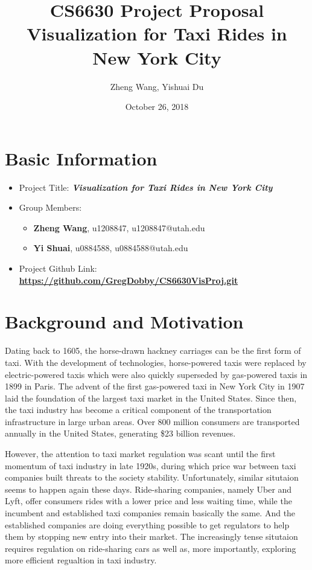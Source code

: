 \documentclass{article}
\title{CS6630 Project Proposal \protect\\ Visualization for Taxi Rides in New York City}
\author{Zheng Wang, Yishuai Du}
\date{October 26, 2018}
\newcommand {\weblink}[1]{\href{#1}{\textbf{#1}}}
\begin{document}
        \maketitle

        \section{Basic Information}
        \begin{itemize} 
           \item Project Title: \textbf{\textit{Visualization for Taxi Rides in New York City}}
           \item Group Members:
           \begin{itemize}
               \item \textbf{Zheng Wang}, u1208847, u1208847@utah.edu
               \item \textbf{Yi Shuai}, u0884588, u0884588@utah.edu 
           \end{itemize}
           \item Project Github Link: \weblink{https://github.com/GregDobby/CS6630VisProj.git}
        \end{itemize}   

        \section{Background and Motivation}

            Dating back to 1605, the horse-drawn hackney carriages can be the first form of taxi. With the development of
            technologies, horse-powered taxis were replaced by electric-powered taxis which were also quickly superseded by gas-powered
            taxis in 1899 in Paris. The advent of the first gas-powered taxi in New York City in 1907 laid the foundation of the largest
            taxi market in the United States. Since then, the taxi industry has become a critical component of the transportation infrastructure
            in large urban areas. Over 800 million consumers are transported annually in the United States, generating \$23 billion revenues.
            
            However, the attention to taxi market regulation was scant until the first momentum of taxi industry in late 1920s, during which price war 
            between taxi companies built threats to the society stability. Unfortunately, similar situtaion seems to happen again these days. 
            Ride-sharing companies, namely Uber and Lyft, offer consumers rides with a lower price and less waiting time, while the incumbent and 
            established taxi companies remain basically the same. And the established companies are doing everything possible to get regulators to help them by
            stopping new entry into their market. The increasingly tense situtaion requires regulation on ride-sharing cars as well as, more importantly,
            exploring more efficient regualtion in taxi industry.
\end{document}
